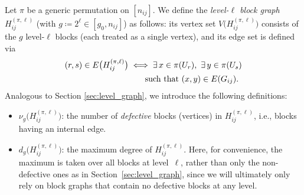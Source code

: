 \documentclass[journal]{IEEEtran}
\theoremstyle{definition}
\theoremstyle{definition}
\newcommand{\PV}{\nu}
\begin{document}


Let \(\pi\) be a generic permutation on $[n_{ij}]$. We define the \emph{level-\(\ell\) block graph} \(H_{ij}^{(\pi,\ell)}\) (with \(g \coloneqq 2^{\ell} \in [g_0,n_{ij}]\)) as follows: its vertex set \(V\big(H_{ij}^{(\pi,\ell)}\big)\) consists of the \(g\) level-\(\ell\) blocks (each treated as a single vertex), and its edge set is defined via
\begin{align}
    (r,s)\in E\big(H_{ij}^{(\pi,\ell)}\big) \notag 
    &\iff \exists\, x\in \pi(U_r),\ \exists\, y\in \pi(U_s) \notag \\
    &\hspace{2em} \text{such that } (x,y)\in E(G_{ij}).
    \label{eq:H_edge_set}
\end{align}
Analogous to Section \ref{sec:level_graph}, we introduce the following definitions:
\begin{itemize}
    \item \(\PV_{g}\big(H_{ij}^{(\pi,\ell)}\big)\): the number of \emph{defective} blocks (vertices) in \(H_{ij}^{(\pi,\ell)}\), i.e., blocks having an internal edge.
    \item $d_{g}\big(H_{ij}^{(\pi,\ell)}\big)$: the maximum degree of $H_{ij}^{(\pi,\ell)}$. Here, for convenience, the maximum is taken over all blocks at level~$\ell$, rather than only the non-defective ones as in Section~\ref{sec:level_graph}, since we will ultimately only rely on block graphs that contain no defective blocks at any level. 
\end{itemize}
\end{document}
